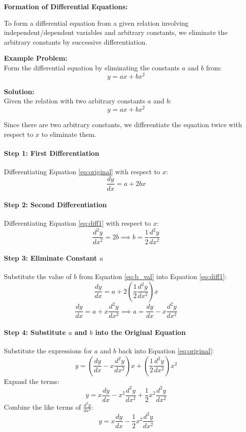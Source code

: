 \documentclass[11pt,a4paper]{article}
\newcommand{\Heading}[1]{\vspace{0.4cm}\noindent\textbf{\textcolor{DeepNavy}{\large #1}}\par\vspace{0.15cm}}
\begin{document}
\Heading{Formation of Differential Equations:}
To form a differential equation from a given relation involving independent/dependent variables and arbitrary constants, we eliminate the arbitrary constants by successive differentiation.

\noindent\textbf{Example Problem:} \\
Form the differential equation by eliminating the constants $a$ and $b$ from:
\begin{equation}
    y = ax + bx^2
\end{equation}

\noindent\textbf{Solution:} \\
Given the relation with two arbitrary constants $a$ and $b$:
\begin{equation}
    y = ax + bx^2 \label{eq:original}
\end{equation}

Since there are two arbitrary constants, we differentiate the equation twice with respect to $x$ to eliminate them.

\paragraph{Step 1: First Differentiation}
Differentiating Equation \eqref{eq:original} with respect to $x$:
\begin{equation}
    \frac{dy}{dx} = a + 2bx \label{eq:diff1}
\end{equation}

\paragraph{Step 2: Second Differentiation}
Differentiating Equation \eqref{eq:diff1} with respect to $x$:
\begin{equation}
    \frac{d^2y}{dx^2} = 2b \implies b = \frac{1}{2}\frac{d^2y}{dx^2} \label{eq:b_val}
\end{equation}

\paragraph{Step 3: Eliminate Constant $a$}
Substitute the value of $b$ from Equation \eqref{eq:b_val} into Equation \eqref{eq:diff1}:
\[
\frac{dy}{dx} = a + 2\left(\frac{1}{2}\frac{d^2y}{dx^2}\right)x
\]
\[
\frac{dy}{dx} = a + x\frac{d^2y}{dx^2} \implies a = \frac{dy}{dx} - x\frac{d^2y}{dx^2} \label{eq:a_val}
\]

\paragraph{Step 4: Substitute $a$ and $b$ into the Original Equation}
Substitute the expressions for $a$ and $b$ back into Equation \eqref{eq:original}:
\[
y = \left(\frac{dy}{dx} - x\frac{d^2y}{dx^2}\right)x + \left(\frac{1}{2}\frac{d^2y}{dx^2}\right)x^2
\]
Expand the terms:
\[
y = x\frac{dy}{dx} - x^2\frac{d^2y}{dx^2} + \frac{1}{2}x^2\frac{d^2y}{dx^2}
\]
Combine the like terms of $\frac{d^2y}{dx^2}$:
\[
y = x\frac{dy}{dx} - \frac{1}{2}x^2\frac{d^2y}{dx^2}
\]
\end{document}
